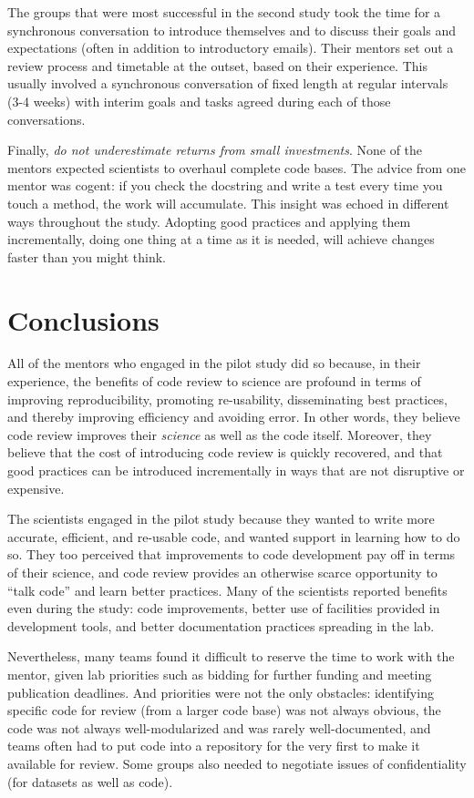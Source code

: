 \documentclass[10pt,twocolumn]{article}
\begin{document}
The groups that were most successful in the second study
took the time for a synchronous conversation to introduce themselves and to discuss their goals and expectations
(often in addition to introductory emails).
Their mentors set out a review process and timetable at the outset,
based on their experience.
This usually involved a synchronous conversation of fixed length at regular intervals (3-4 weeks)
with interim goals and tasks agreed during each of those conversations.

Finally,
\emph{do not underestimate returns from small investments}.
None of the mentors expected scientists to overhaul complete code bases.
The advice from one mentor was cogent:
if you check the docstring and write a test every time you touch a method,
the work will accumulate.
This insight was echoed in different ways throughout the study.
Adopting good practices and applying them incrementally,
doing one thing at a time as it is needed,
will achieve changes faster than you might think.

\section{Conclusions}

All of the mentors who engaged in the pilot study did so because,
in their experience,
the benefits of code review to science are profound in terms of improving reproducibility,
promoting re-usability,
disseminating best practices,
and thereby improving efficiency and avoiding error.
In other words,
they believe code review improves their \emph{science}
as well as the code itself.
Moreover,
they believe that the cost of introducing code review is quickly recovered,
and that good practices can be introduced incrementally in ways that are not disruptive or expensive.

The scientists engaged in the pilot study because they wanted to write more accurate, efficient, and re-usable code,
and wanted support in learning how to do so.
They too perceived that improvements to code development pay off in terms of their science,
and code review provides an otherwise scarce opportunity to ``talk code'' and learn better practices.
Many of the scientists reported benefits even during the study:
code improvements,
better use of facilities provided in development tools,
and better documentation practices spreading in the lab.  

Nevertheless,
many teams found it difficult to reserve the time to work with the mentor,
given lab priorities such as bidding for further funding and meeting publication deadlines.
And priorities were not the only obstacles:
identifying specific code for review (from a larger code base) was not always obvious,
the code was not always well-modularized and was rarely well-documented,
and teams often had to put code into a repository for the very first to make it available for review.
Some groups also needed to negotiate issues of confidentiality (for datasets as well as code).
\end{document}
